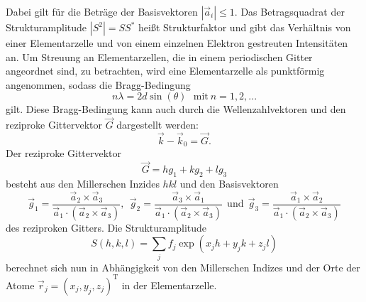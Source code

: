 Dabei gilt für die Beträge der Basisvektoren $|\vec a_i|\le 1$.
Das Betragsquadrat der Strukturamplitude  $|S^2|=SS^*$ heißt Strukturfaktor und gibt das Verhältnis von einer Elementarzelle und von einem einzelnen Elektron gestreuten Intensitäten an.
Um Streuung an Elementarzellen, die in einem periodischen Gitter angeordnet sind, zu betrachten, wird eine Elementarzelle als punktförmig angenommen, sodass die Bragg-Bedingung
\begin{equation}
  n\lambda=2d\sin\left(\theta\right)~~~\text{mit}~n=1,2,...
  \label{eq:bragg}
\end{equation}
gilt.
Diese Bragg-Bedingung kann auch durch die Wellenzahlvektoren und den reziproke Gittervektor $\vec G$ dargestellt werden:
\begin{equation}
  \vec k -\vec k_0 =\vec G.
\end{equation}
Der reziproke Gittervektor
\begin{equation}
  \vec G= h g_1+kg_2+lg_3
\end{equation}
besteht aus den Millerschen Inzides $hkl$ und den Basisvektoren
\begin{equation}
   \vec g_1=\frac{\vec a_2\times \vec a_3}{\vec a_1 \cdot \left(\vec a_2 \times \vec a_3\right)}, ~~  \vec g_2=\frac{\vec a_3\times \vec a_1}{\vec a_1 \cdot \left(\vec a_2 \times \vec a_3\right)}~~\text{und}~~  \vec g_3=\frac{\vec a_1\times \vec a_2}{\vec a_1 \cdot \left(\vec a_2 \times \vec a_3\right)}
\end{equation}
des reziproken Gitters.
Die Strukturamplitude
\begin{equation}
  S(h,k,l)=\sum _j f_j\exp\left(x_j h+ y_jk+z_j l\right)
\end{equation}
berechnet sich nun in Abhängigkeit von den Millerschen Indizes und der Orte der Atome $\vec r_j=\left(x_j, y_j, z_j\right)^\text{T}$  in der Elementarzelle.
